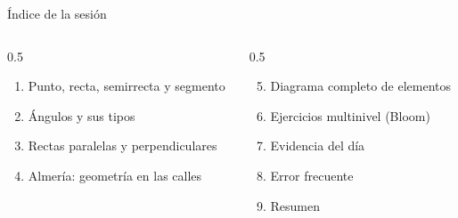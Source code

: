 \documentclass[aspectratio=169, 10pt, spanish]{beamer}
\begin{document}
\begin{frame}[plain]
  \titlepage
\end{frame}

\begin{frame}{Índice de la sesión}
  \begin{columns}[t]
    \begin{column}{0.5\textwidth}
      \begin{enumerate}
        \item Punto, recta, semirrecta y segmento
        \item Ángulos y sus tipos
        \item Rectas paralelas y perpendiculares
        \item Almería: geometría en las calles
      \end{enumerate}
    \end{column}
    \begin{column}{0.5\textwidth}
      \begin{enumerate}
        \setcounter{enumi}{4}
        \item Diagrama completo de elementos
        \item Ejercicios multinivel (Bloom)
        \item Evidencia del día
        \item Error frecuente
        \item Resumen
      \end{enumerate}
    \end{column}
  \end{columns}
\end{frame}

\end{document}
